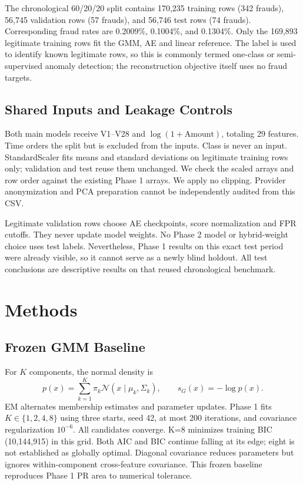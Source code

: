 \documentclass[conference]{IEEEtran}
\begin{document}
The chronological 60/20/20 split contains 170,235 training rows (342 frauds), 56,745 validation rows (57 frauds), and 56,746 test rows (74 frauds). Corresponding fraud rates are 0.2009\%, 0.1004\%, and 0.1304\%. Only the 169,893 legitimate training rows fit the GMM, AE and linear reference. The label is used to identify known legitimate rows, so this is commonly termed one-class or semi-supervised anomaly detection; the reconstruction objective itself uses no fraud targets.

\subsection{Shared Inputs and Leakage Controls}
Both main models receive V1--V28 and $\log(1+\mathrm{Amount})$, totaling 29 features. Time orders the split but is excluded from the inputs. Class is never an input. StandardScaler fits means and standard deviations on legitimate training rows only; validation and test reuse them unchanged. We check the scaled arrays and row order against the existing Phase 1 arrays. We apply no clipping. Provider anonymization and PCA preparation cannot be independently audited from this CSV.

Legitimate validation rows choose AE checkpoints, score normalization and FPR cutoffs. They never update model weights. No Phase 2 model or hybrid-weight choice uses test labels. Nevertheless, Phase 1 results on this exact test period were already visible, so it cannot serve as a newly blind holdout. All test conclusions are descriptive results on that reused chronological benchmark.

\section{Methods}
\subsection{Frozen GMM Baseline}
For $K$ components, the normal density is
\begin{equation}
p(x)=\sum_{k=1}^{K}\pi_k\mathcal{N}(x\mid\mu_k,\Sigma_k),\qquad s_G(x)=-\log p(x).
\end{equation}
EM alternates membership estimates and parameter updates. Phase 1 fits $K\in\{1,2,4,8\}$ using three starts, seed 42, at most 200 iterations, and covariance regularization $10^{-6}$. All candidates converge. K=8 minimizes training BIC (10,144,915) in this grid. Both AIC and BIC continue falling at its edge; eight is not established as globally optimal. Diagonal covariance reduces parameters but ignores within-component cross-feature covariance. This frozen baseline reproduces Phase 1 PR area to numerical tolerance.
\end{document}

